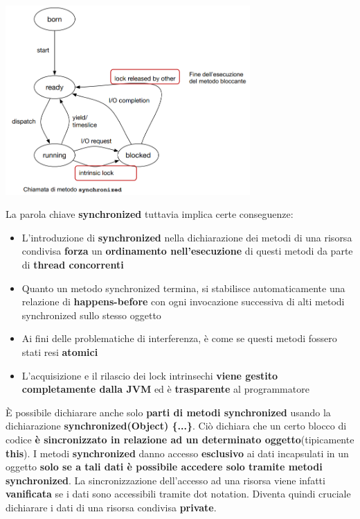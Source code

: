 \documentclass[12pt]{article}
\begin{document}
\begin{center}
    \includegraphics[width = 0.70\textwidth]{Images/83.PNG}
\end{center}
La parola chiave \textbf{synchronized} tuttavia implica certe conseguenze:
\begin{itemize}
    \item L'introduzione di \textbf{synchronized} nella dichiarazione dei metodi di una risorsa condivisa \textbf{forza} un \textbf{ordinamento nell'esecuzione} di questi metodi da parte di \textbf{thread concorrenti}
    \item Quanto un metodo synchronized termina, si stabilisce automaticamente una relazione di \textbf{happens-before} con ogni invocazione successiva di alti metodi synchronized sullo stesso oggetto
    \item Ai fini delle problematiche di interferenza, è come se questi metodi fossero stati resi \textbf{atomici}
    \item L'acquisizione e il rilascio dei lock intrinsechi \textbf{viene gestito completamente dalla JVM} ed è \textbf{trasparente} al programmatore
\end{itemize}
È possibile dichiarare anche solo \textbf{parti di metodi synchronized} usando la dichiarazione \textbf{synchronized(Object) \{...\}}. Ciò dichiara che un certo blocco di codice \textbf{è sincronizzato in relazione ad un determinato oggetto}(tipicamente \textbf{this}). \newline
I metodi \textbf{synchronized} danno accesso \textbf{esclusivo} ai dati incapsulati in un oggetto \textbf{solo se a tali dati è possibile accedere solo tramite metodi synchronized}. La sincronizzazione dell'accesso ad una risorsa viene infatti \textbf{vanificata} se i dati sono accessibili tramite dot notation. Diventa quindi cruciale dichiarare i dati di una risorsa condivisa \textbf{private}. \newline
\end{document}
